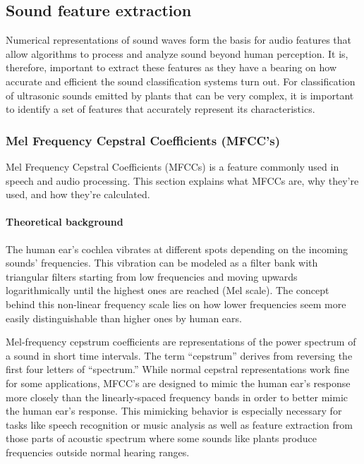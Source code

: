 \subsection{Sound feature extraction}
Numerical representations of sound waves form the basis for audio features that allow algorithms to process and analyze sound beyond human perception. It is, therefore, important to extract these features as they have a bearing on how accurate and efficient the sound classification systems turn out. For classification of ultrasonic sounds emitted by plants that can be very complex, it is important to identify a set of features that accurately represent its characteristics.


\subsubsection{Mel Frequency Cepstral Coefficients (MFCC's)}
Mel Frequency Cepstral Coefficients (MFCCs) is a feature commonly used in speech and audio processing. This section explains what MFCCs are, why they’re used, and how they’re calculated.

\paragraph{Theoretical background}
The human ear's cochlea vibrates at different spots depending on the incoming sounds’ frequencies. This vibration can be modeled as a filter bank with triangular filters starting from low frequencies and moving upwards logarithmically until the highest ones are reached (Mel scale). The concept behind this non-linear frequency scale lies on how lower frequencies seem more easily distinguishable than higher ones by human ears. \cite{casale_physiology_2024}

Mel-frequency cepstrum coefficients are representations of the power spectrum of a sound in short time intervals. The term “cepstrum” derives from reversing the first four letters of “spectrum.” While normal cepstral representations work fine for some applications, MFCC's are designed to mimic the human ear's response more closely than the linearly-spaced frequency bands in order to better mimic the human ear’s response. This mimicking behavior is especially necessary for tasks like speech recognition or music analysis as well as feature extraction from those parts of acoustic spectrum where some sounds like plants produce frequencies outside normal hearing ranges. \cite{noauthor_mel-frequency_2024}


